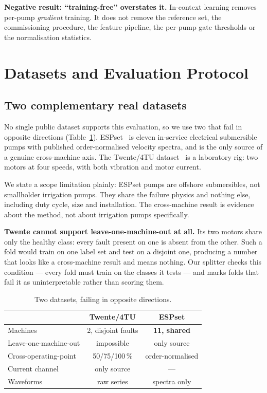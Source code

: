 \documentclass[conference,a4paper,10pt]{IEEEtran}
\begin{document}
\textbf{Negative result: ``training-free'' overstates it.} In-context learning
removes per-pump \emph{gradient} training. It does not remove the reference set,
the commissioning procedure, the feature pipeline, the per-pump gate thresholds
or the normalisation statistics.

\section{Datasets and Evaluation Protocol}
\subsection{Two complementary real datasets}
No single public dataset supports this evaluation, so we use two that fail in
opposite directions (Table~\ref{tab:datasets}). ESPset~\cite{varejao2024} is
eleven in-service electrical submersible pumps with published order-normalised
velocity spectra, and is the only source of a genuine cross-machine axis. The
Twente/4TU dataset~\cite{kumar2023} is a laboratory rig: two motors at four
speeds, with both vibration and motor current.

We state a scope limitation plainly: ESPset pumps are offshore submersibles, not
smallholder irrigation pumps. They share the failure physics and nothing else,
including duty cycle, size and installation. The cross-machine result is evidence
about the method, not about irrigation pumps specifically.

\textbf{Twente cannot support leave-one-machine-out at all.} Its two motors share
only the healthy class: every fault present on one is absent from the other. Such
a fold would train on one label set and test on a disjoint one, producing a number
that looks like a cross-machine result and means nothing. Our splitter checks this
condition --- every fold must train on the classes it tests --- and marks folds
that fail it as uninterpretable rather than scoring them.

\begin{table}[t]
\caption{Two datasets, failing in opposite directions.}
\label{tab:datasets}
\centering
\small
\begin{tabular}{lcc}
\toprule
 & Twente/4TU & ESPset \\
\midrule
Machines & 2, disjoint faults & \textbf{11, shared} \\
Leave-one-machine-out & impossible & only source \\
Cross-operating-point & 50/75/100\,\% & order-normalised \\
Current channel & only source & --- \\
Waveforms & raw series & spectra only \\
\bottomrule
\end{tabular}
\end{table}
\end{document}
